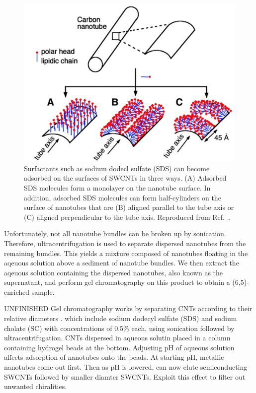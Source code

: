 \begin{figure}[h]
\centering
\includegraphics[scale=0.3]{images/chapter_methods/surfactant_tkalya}
\caption{Surfactants such as sodium dodecl sulfate (SDS) can become adsorbed on the surfaces of SWCNTs in three ways. (A) Adsorbed SDS molecules form a monolayer on the nanotube surface. In addition, adsorbed SDS molecules can form half-cylinders on the surface of nanotubes that are (B) aligned parallel to the tube axis or (C) aligned perpendicular to the tube axis. Reproduced from Ref.\ \cite{richard2003supramolecular}. }
\label{fig:sds_molecule}
\end{figure}

Unfortunately, not all nanotube bundles can be broken up by sonication. Therefore, ultracentrifugation is used to separate dispersed nanotubes from the remaining bundles. This yields a mixture composed of nanotubes floating in the aqeuous solution above a sediment of nanotube bundles. We then extract the aqeuous solution containing the dispersed nanotubes, also known as the supernatant, and perform gel chromatography on this product to obtain a (6,5)-enriched sample.

{\color{red} UNFINISHED} Gel chromatography works by separating CNTs according to their relative diameters \cite{ichinose2017extraction}. which include sodium dodecyl sulfate (SDS) and sodium cholate (SC) with concentrations of 0.5\% each, using sonication followed by ultracentrifugation. CNTs dispersed in aqueous solutin placed in a column containing hydrogel beads at the bottom. Adjusting pH of aqueous solution affects adsorption of nanotubes onto the beads. At starting pH, metallic nanotubes come out first. Then as pH is lowered, can now elute semiconducting SWCNTs followed by smaller diamter SWCNTs. Exploit this effect to filter out unwanted chiralities.

